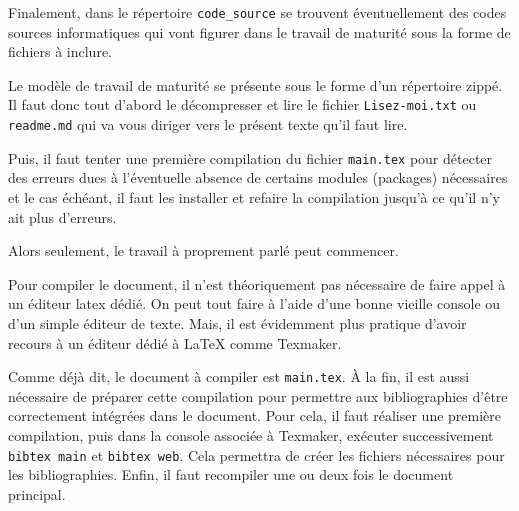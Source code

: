 Finalement, dans le répertoire \verb|code_source| se trouvent éventuellement des codes sources informatiques qui vont figurer dans le travail de maturité sous la forme de fichiers à inclure.

Le modèle de travail de maturité se présente sous le forme d'un répertoire zippé. Il faut donc tout d'abord le décompresser et lire le fichier \verb|Lisez-moi.txt| ou \verb|readme.md| qui va vous diriger vers le présent texte qu'il faut lire.

Puis, il faut tenter une première compilation du fichier \verb|main.tex| pour détecter des erreurs dues à l'éventuelle absence de certains modules (packages) nécessaires et le cas échéant, il faut les installer et refaire la compilation jusqu'à ce qu'il n'y ait plus d'erreurs.

Alors seulement, le travail à proprement parlé peut commencer.

Pour compiler le document, il n'est théoriquement pas nécessaire de faire appel à un éditeur latex dédié. On peut tout faire à l'aide d'une bonne vieille console ou d'un simple éditeur de texte. Mais, il est évidemment plus pratique d'avoir recours à un éditeur dédié à \LaTeX{} comme Texmaker.

Comme déjà dit, le document à compiler est \verb|main.tex|. À la fin, il est aussi nécessaire de préparer cette compilation pour permettre aux bibliographies d'être correctement intégrées dans le document. Pour cela, il faut réaliser une première compilation, puis dans la console associée à Texmaker, exécuter successivement \lstinline|bibtex main| et \lstinline|bibtex web|. Cela permettra de créer les fichiers nécessaires pour les bibliographies. Enfin, il faut recompiler une ou deux fois le document principal.